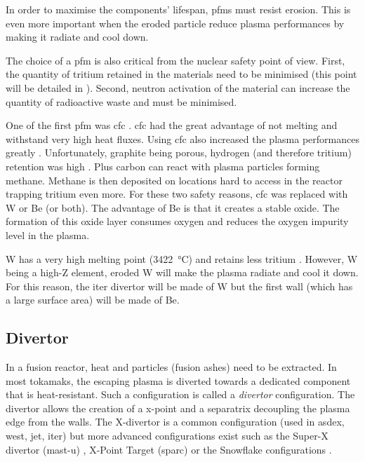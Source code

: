 In order to maximise the components' lifespan, \glspl{pfm} must resist erosion.
This is even more important when the eroded particle reduce \gls{plasma} performances by making it radiate and cool down.

The choice of a \gls{pfm} is also critical from the nuclear safety point of view.
First, the quantity of tritium retained in the materials need to be minimised (this point will be detailed in ).
Second, neutron activation of the material can increase the quantity of radioactive waste and must be minimised.

One of the first \gls{pfm} was \gls{cfc} .
\gls{cfc} had the great advantage of not melting and withstand very high heat fluxes.
Using \gls{cfc} also increased the \gls{plasma} performances greatly .
Unfortunately, graphite being porous, hydrogen (and therefore tritium) retention was high .
Plus carbon can react with \gls{plasma} particles forming methane.
Methane is then deposited on locations hard to access in the reactor \gls{trapping} tritium even more.
For these two safety reasons, \gls{cfc} was replaced with \Gls{W} or \gls{Be} (or both).
The advantage of \gls{Be} is that it creates a stable oxide.
The formation of this oxide layer consumes oxygen and reduces the oxygen impurity level in the plasma.

\Gls{W} has a very high melting point (\SI{3422}{\celsius}) and retains less tritium .
However, \Gls{W} being a high-Z element, eroded \Gls{W} will make the \gls{plasma} radiate and cool it down.
For this reason, the \acrshort{iter} divertor will be made of \Gls{W} but the first wall (which has a large surface area) will be made of \gls{Be}.

\subsection{Divertor}

In a fusion reactor, heat and particles (fusion ashes) need to be extracted.
In most \glspl{tokamak}, the escaping \gls{plasma} is diverted towards a dedicated component that is heat-resistant.
Such a configuration is called a \emph{\gls{divertor}} configuration.
The \gls{divertor} allows the creation of a \gls{x-point} and a \gls{separatrix} decoupling the \gls{plasma} edge from the walls. 
The X-divertor is a common configuration (used in \acrshort{asdex}, \acrshort{west}, \acrshort{jet}, \acrshort{iter}) but more advanced configurations exist such as the Super-X \gls{divertor} (\acrshort{mast-u}) , X-Point Target (\acrshort{sparc})  or the Snowflake configurations .

